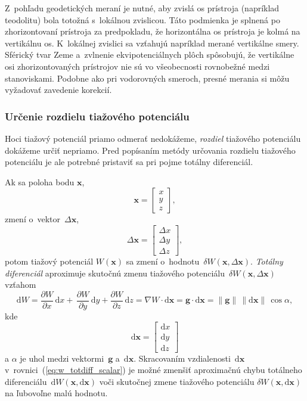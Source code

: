 \documentclass[a4paper,12pt]{book}
\newcommand{\diff}{\mathrm d}
\let\vec\mathbf
\begin{document}
Z~pohľadu geodetických meraní je nutné, aby zvislá os prístroja (napríklad
teodolitu) bola totožná s~lokálnou zvislicou.  Táto podmienka je splnená po
zhorizontovaní prístroja za predpokladu, že horizontálna os prístroja je kolmá
na vertikálnu os.  K~lokálnej zvislici sa vzťahujú napríklad merané
vertikálne smery.  Sférický tvar Zeme a~zvlnenie ekvipotenciálnych plôch
spôsobujú, že vertikálne osi zhorizontovaných prístrojov nie sú vo všeobecnosti
rovnobežné medzi stanoviskami.  Podobne ako pri vodorovných smeroch, presné
merania si môžu vyžadovať zavedenie korekcií.

\subsubsection{Určenie rozdielu tiažového potenciálu}
\label{sec:potential_differences}

Hoci tiažový potenciál priamo odmerať nedokážeme, \emph{rozdiel} tiažového 
potenciálu dokážeme určiť nepriamo.  Pred popísaním metódy určovania rozdielu 
tiažového potenciálu je ale potrebné pristaviť sa pri pojme totálny 
diferenciál.

Ak sa poloha bodu $\vec x$,
%
\begin{equation}
\vec x =
\begin{bmatrix}
x\\
y\\
z
\end{bmatrix}
{,}
\end{equation}
%
zmení o~vektor~$\Delta \vec x$,
%
\begin{equation}
\label{eq:deltax}
\Delta \vec x =
\begin{bmatrix}
\Delta x\\
\Delta y\\
\Delta z
\end{bmatrix}
{,}
\end{equation}
%
potom tiažový potenciál $W(\vec x)$ sa zmení o~hodnotu~$\delta W(\vec x, \Delta 
\vec x)$.  \emph{Totálny diferenciál} aproximuje skutočnú zmenu tiažového 
potenciálu~$\delta W(\vec x, \Delta \vec x)$ vzťahom
%
\begin{equation}
\label{eq:w_totdiff_scalar}
\diff W = \frac{\partial W}{\partial x} \, \diff x + \, \frac{\partial 
W}{\partial y} \, \diff y + \frac{\partial W}{\partial z} \, \diff z = \nabla 
W \cdot \diff \vec x = \vec g \cdot \diff \vec x = \| \vec g \| \, \| \diff 
\vec x \| \, \cos\alpha{,}
\end{equation}
%
kde
%
\begin{equation}
\label{eq:diffx}
\diff \vec x =
\begin{bmatrix}
\diff x\\
\diff y\\
\diff z
\end{bmatrix}
\end{equation}
%
a $\alpha$ je uhol medzi vektormi~$\vec g$ a~$\diff \vec x$.  Skracovaním 
vzdialenosti~$\diff \vec x$ v~rovnici~(\ref{eq:w_totdiff_scalar}) je možné 
zmenšiť aproximačnú chybu totálneho diferenciálu~$\diff W(\vec x, \diff \vec 
x)$ voči skutočnej zmene tiažového potenciálu $\delta W(\vec x, \diff \vec x)$ 
na ľubovoľne malú hodnotu.
\end{document}
